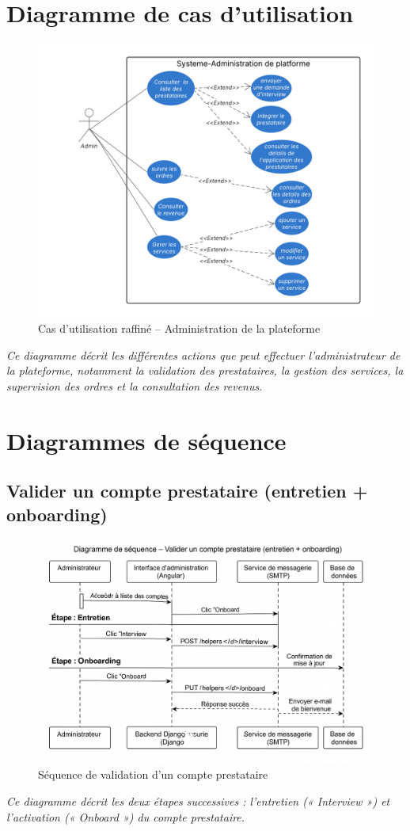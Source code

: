 \section*{Diagramme de cas d'utilisation}
\begin{figure}[H]
\centering
\includegraphics[width=0.85\linewidth]{figures/administration platforme.png}
\caption{Cas d'utilisation raffiné – Administration de la plateforme}
\end{figure}
\textit{Ce diagramme décrit les différentes actions que peut effectuer l’administrateur de la plateforme, notamment la validation des prestataires, la gestion des services, la supervision des ordres et la consultation des revenus.}

\section{Diagrammes de séquence}

\subsection*{Valider un compte prestataire (entretien + onboarding)}
\begin{figure}[H]
\centering
\includegraphics[width=0.90\linewidth]{figures/validation compte seq.png}
\caption{Séquence de validation d’un compte prestataire}
\end{figure}
\textit{Ce diagramme décrit les deux étapes successives : l’entretien (« Interview ») et l’activation (« Onboard ») du compte prestataire.}

